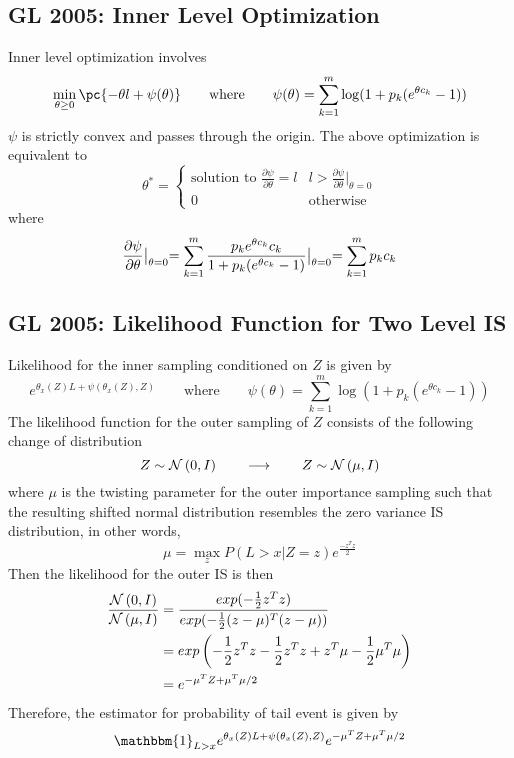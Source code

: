 \documentclass[11pt]{article}
\begin{document}
\newpage
\subsection*{GL 2005: Inner Level Optimization}

Inner level optimization involves 
\[
    \min_{\theta \geq 0} \pc{
        -\theta l + \psi(\theta)
    }
    \quad\quad
    \text{where}
    \quad\quad
    \psi(\theta) = \sum_{k=1}^m \log (1 + p_k (e^{\theta c_k} - 1))
\]
$\psi$ is strictly convex and passes through the origin. The above optimization is equivalent to 
\[
    \theta^* = 
    \begin{cases}
        \text{solution to } \frac{\partial \psi}{\partial \theta} = l & l > \frac{\partial\psi}{\partial\theta} |_{\theta=0} \\
        0 & \text{otherwise}
    \end{cases}    
\]
where
\[
    \frac{\partial\psi}{\partial\theta} \bigl\vert_{\large\theta=0}
        = \sum_{k=1}^m \frac{p_k e^{\theta c_k}  c_k}{1 + p_k (e^{\theta c_k} - 1)} \bigl\vert_{\large\theta=0}
        = \sum_{k=1}^m p_k c_k
\]


\newpage 
\subsection*{GL 2005: Likelihood Function for Two Level IS}


Likelihood for the inner sampling conditioned on $Z$ is given by 
\[
    e^{\theta_x(Z)L + \psi(\theta_x(Z), Z)}
    \qquad \text{where} \qquad 
    \psi(\theta) = \sum_{k=1}^m \log (1 + p_k (e^{\theta c_k} - 1))
\]
The likelihood function for the outer sampling of $Z$ consists of the following change of distribution
\[
    Z \sim \mathcal{N}\left(0, I\right)    
    \qquad \longrightarrow \qquad 
    Z \sim \mathcal{N}\left(\mu, I\right)
\]
where $\mu$ is the twisting parameter for the outer importance sampling such that the resulting shifted normal distribution resembles the zero variance IS distribution, in other words,
\[
    \mu = \max_z P(L>x | Z=z) e^{\frac{-z^T z}{2}}
\]
Then the likelihood for the outer IS is then 
\begin{align*}
    \frac{\mathcal{N}\left(0, I\right)}{\mathcal{N}\left(\mu, I\right)}
    &= \frac{exp(-\frac{1}{2} z^T z)}{exp(-\frac{1}{2} (z-\mu)^T (z-\mu))} \\ 
    &= exp
    \left(
        -\frac{1}{2} z^T z - \frac{1}{2} z^T z + z^T \mu - \frac{1}{2} \mu^T \mu
    \right) \\
    &= e^{ -\mu^T Z + \mu^T \mu /2 } 
\end{align*}
Therefore, the estimator for probability of tail event is given by 
\[
    \mathbbm{1}_{L>x} e^{\theta_x(Z)L + \psi(\theta_x(Z), Z)} e^{ -\mu^T Z + \mu^T \mu /2 }
\]
\end{document}

